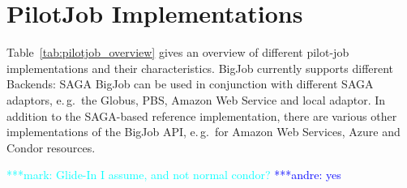 \documentclass[]{article}
\newcommand{\alnote}[1]{ {\textcolor{blue} { ***andre: #1 }}}
\newcommand{\msnote}[1]{ {\textcolor{cyan} { ***mark: #1 }}}
\newcommand{\alnote}[1]{}
\begin{document}
\section{PilotJob Implementations}

Table~\ref{tab:pilotjob_overview} gives an overview of different pilot-job
implementations and their characteristics. BigJob currently supports different
Backends: SAGA BigJob can be used in conjunction with different SAGA adaptors,
e.\,g.\ the Globus, PBS, Amazon Web Service and local adaptor. In addition to
the SAGA-based reference implementation, there are various other implementations
of the BigJob API, e.\,g.\ for Amazon Web Services, Azure and Condor resources.


\msnote{Glide-In I assume, and not normal condor?}\alnote{yes}
\end{document}
